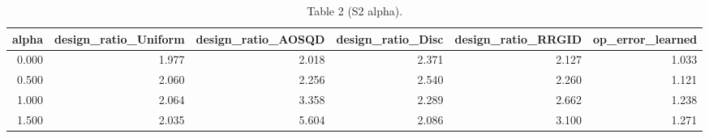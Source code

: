 \begin{table}[t]
\centering
\small
\caption{Table 2 (S2 alpha).}
\label{tab:Table_2_S2_alpha}
\begin{tabular}{rrrrrr}
\toprule
alpha & design\_ratio\_Uniform & design\_ratio\_AOSQD & design\_ratio\_Disc & design\_ratio\_RRGID & op\_error\_learned \\
\midrule
0.000 & 1.977 & 2.018 & 2.371 & 2.127 & 1.033 \\
0.500 & 2.060 & 2.256 & 2.540 & 2.260 & 1.121 \\
1.000 & 2.064 & 3.358 & 2.289 & 2.662 & 1.238 \\
1.500 & 2.035 & 5.604 & 2.086 & 3.100 & 1.271 \\
\bottomrule
\end{tabular}
\end{table}
